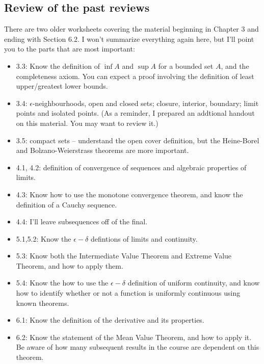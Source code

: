 \documentclass[letterpaper,12pt]{article}
\begin{document}
 \subsection*{Review of the past reviews}
There are two older worksheets covering the material beginning in Chapter 3 and ending with Section 6.2. I won't summarize everything again here, but I'll point you to the parts that are most important:
\begin{itemize}
 \item 3.3: Know the definition of $\inf A$ and $\sup A$ for a bounded set $A$, and the completeness axiom. You can expect a proof involving the definition of least upper/greatest lower bounds.
 \item 3.4: $\epsilon$-neighbourhoods, open and closed sets; closure, interior, boundary; limit points and isolated points. (As a reminder, I prepared an addtional handout on this material. You may want to review it.)
 \item 3.5: compact sets --  understand the open cover definition, but the Heine-Borel and Bolzano-Weierstrass theorems are more important.
 \item 4.1, 4.2: definition of convergence of sequences and algebraic properties of limits.
 \item 4.3: Know how to use the monotone convergence theorem, and know the definition of a Cauchy sequence.
 \item 4.4: I'll leave subsequences off of the final.
 \item 5.1,5.2: Know the $\epsilon-\delta$ defintions of limits and continuity.
 \item 5.3: Know both the Intermediate Value Theorem and Extreme Value Theorem, and how to apply them.
 \item 5.4: Know the how to use the $\epsilon-\delta$ definition of uniform continuity, and know how to identify whether or not a function is uniformly continuous using known theorems.
 \item 6.1: Know the definition of the derivative and its properties.
 \item 6.2: Know the statement of the Mean Value Theorem, and how to apply it. Be aware of how many subsequent results in the course are dependent on this theorem. 
\end{itemize}
\end{document}

